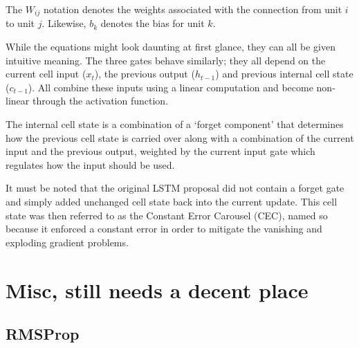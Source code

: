 The $W_{ij}$ notation denotes the weights associated
with the connection from unit $i$ to unit $j$.
Likewise, $b_k$ denotes the bias for unit $k$.

While the equations might look daunting at first glance,
they can all be given intuitive meaning.
The three gates behave similarly;
they all depend on the current cell input ($x_t$),
the previous output ($h_{t-1}$)
and previous internal cell state ($c_{t-1}$).
All combine these inputs using a linear computation
and become non-linear through the activation function.

The internal cell state is a combination
of a `forget component' that determines
how the previous cell state is carried over
along with a combination of the current input and the previous output,
weighted by the current input gate
which regulates how the input should be used.

It must be noted that the original LSTM proposal
did not contain a forget gate
and simply added unchanged cell state
back into the current update.
This cell state was then referred to as the Constant Error Carousel (CEC),
named so because it enforced a constant error
in order to mitigate the vanishing and exploding gradient problems.



\section{Misc, still needs a decent place}
\subsection{RMSProp}
\label{sub:rmsprop}
